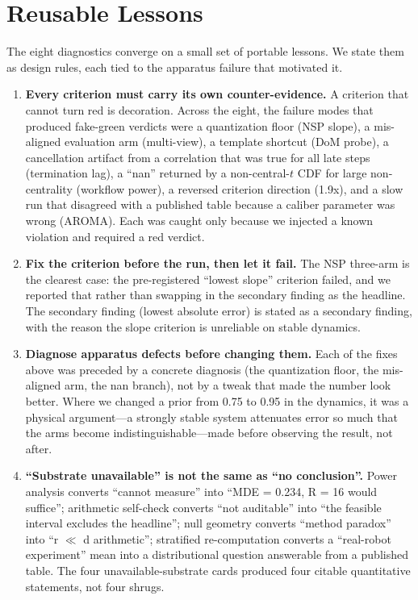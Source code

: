 \section{Reusable Lessons}
\label{sec:lessons}

The eight diagnostics converge on a small set of portable lessons. We state them
as design rules, each tied to the apparatus failure that motivated it.

\begin{enumerate}
  \item \textbf{Every criterion must carry its own counter-evidence.} A criterion
  that cannot turn red is decoration. Across the eight, the failure modes that
  produced fake-green verdicts were a quantization floor (NSP slope), a
  mis-aligned evaluation arm (multi-view), a template shortcut (DoM probe), a
  cancellation artifact from a correlation that was true for all late steps
  (termination lag), a ``nan'' returned by a non-central-$t$ CDF for large
  non-centrality (workflow power), a reversed criterion direction (1.9x), and a
  slow run that disagreed with a published table because a caliber parameter was
  wrong (AROMA). Each was caught only because we injected a known violation and
  required a red verdict.

  \item \textbf{Fix the criterion before the run, then let it fail.} The NSP
  three-arm is the clearest case: the pre-registered ``lowest slope'' criterion
  failed, and we reported that rather than swapping in the secondary finding as
  the headline. The secondary finding (lowest absolute error) is stated as a
  secondary finding, with the reason the slope criterion is unreliable on stable
  dynamics.

  \item \textbf{Diagnose apparatus defects before changing them.} Each of the
  fixes above was preceded by a concrete diagnosis (the quantization floor, the
  mis-aligned arm, the nan branch), not by a tweak that made the number look
  better. Where we changed a prior from 0.75 to 0.95 in the dynamics, it was a
  physical argument---a strongly stable system attenuates error so much that the
  arms become indistinguishable---made before observing the result, not after.

  \item \textbf{``Substrate unavailable'' is not the same as ``no conclusion''.}
  Power analysis converts ``cannot measure'' into ``MDE = 0.234, R = 16 would
  suffice''; arithmetic self-check converts ``not auditable'' into ``the feasible
  interval excludes the headline''; null geometry converts ``method paradox''
  into ``r $\ll$ d arithmetic''; stratified re-computation converts a
  ``real-robot experiment'' mean into a distributional question answerable from
  a published table. The four unavailable-substrate cards produced four citable
  quantitative statements, not four shrugs.


\end{enumerate}
